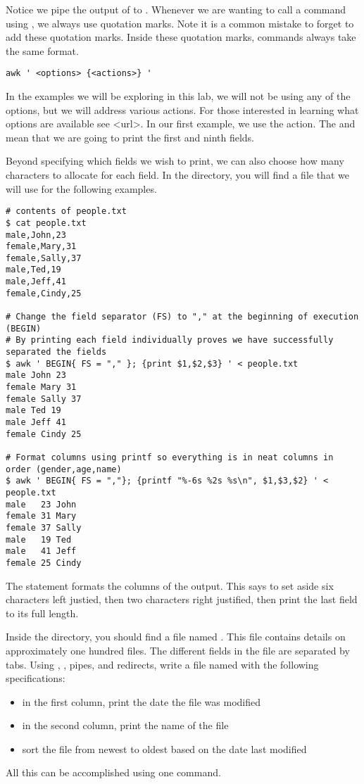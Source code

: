 Notice we pipe the output of  to . Whenever we are wanting to call a command using , we always use quotation marks. Note it is a common mistake to forget to add these quotation marks. Inside these quotation marks, commands always take the same format.

\begin{lstlisting}
awk ' <options> {<actions>} '
\end{lstlisting}

In the examples we will be exploring in this lab, we will not be using any of the options, but we will address various actions. For those interested in learning what options are available see <url>. In our first example, we use the  action. The  and  mean that we are going to print the first and ninth fields.

Beyond specifying which fields we wish to print, we can also choose how many characters to allocate for each field. In the  directory, you will find a  file that we will use for the following examples.

\begin{lstlisting}
# contents of people.txt
$ cat people.txt
male,John,23
female,Mary,31
female,Sally,37
male,Ted,19
male,Jeff,41
female,Cindy,25

# Change the field separator (FS) to "," at the beginning of execution (BEGIN)
# By printing each field individually proves we have successfully separated the fields
$ awk ' BEGIN{ FS = "," }; {print $1,$2,$3} ' < people.txt
male John 23
female Mary 31
female Sally 37
male Ted 19
male Jeff 41
female Cindy 25

# Format columns using printf so everything is in neat columns in order (gender,age,name)
$ awk ' BEGIN{ FS = ","}; {printf "%-6s %2s %s\n", $1,$3,$2} ' < people.txt
male   23 John
female 31 Mary
female 37 Sally
male   19 Ted
male   41 Jeff
female 25 Cindy
\end{lstlisting}

The statement  formats the columns of the output. This says to set aside six characters left justied, then two characters right justified, then print the last field to its full length.

\begin{problem}
Inside the  directory, you should find a file named . This file contains details on approximately one hundred files. The different fields in the file are separated by tabs. Using , , pipes, and redirects, write a file named  with the following specifications:
\begin{itemize}
\item in the first column, print the date the file was modified
\item in the second column, print the name of the file
\item sort the file from newest to oldest based on the date last modified
\end{itemize}
All this can be accomplished using one command.
\end{problem}

